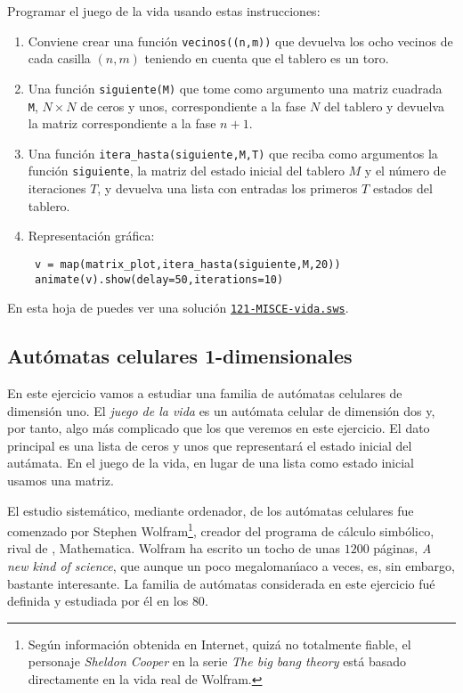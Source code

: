 \begin{ejer}
 
{\sc Programar} el juego de la vida usando estas instrucciones:

\begin{enumerate}
\item Conviene crear una funci\'on {\tt vecinos((n,m))} que devuelva los ocho
vecinos de cada casilla $(n,m)$ teniendo en cuenta que el tablero es un toro.
\item Una funci\'on {\tt siguiente(M)} que tome como argumento una matriz
cuadrada {\tt M}, $N\times N$ de ceros y unos,  correspondiente a la fase $N$
del tablero y devuelva la matriz correspondiente a la fase $n+1$. 
\item Una funci\'on {\tt itera\_hasta(siguiente,M,T)} que reciba como argumentos
la funci\'on {\tt siguiente},  la matriz del estado inicial del tablero $M$ y el
n\'umero de iteraciones $T$,  y devuelva una lista con entradas los primeros $T$
estados del tablero.
\item Representaci\'on gr\'afica:
\begin{verbatim}
 v = map(matrix_plot,itera_hasta(siguiente,M,20))
 animate(v).show(delay=50,iterations=10)
\end{verbatim}

\end{enumerate}

\end{ejer}

En esta hoja de {\sage} puedes ver una soluci\'on
\href{http://localhost:8080/home/admin/??}{\tt 121-MISCE-vida.sws}.

\subsection{Aut\'omatas celulares 1-dimensionales}

En este ejercicio vamos a estudiar una familia de aut\'omatas celulares de 
dimensi\'on uno. El {\itshape juego de la vida} es un aut\'omata celular de 
dimensi\'on dos y, por tanto, algo m\'as complicado que los que veremos en este 
ejercicio. El dato principal es una lista de ceros y unos que representar\'a el 
estado inicial del aut\'amata. En el juego de la vida, en lugar de una lista 
como estado inicial usamos una matriz.

El estudio sistem\'atico, mediante ordenador, de los aut\'omatas celulares fue 
comenzado por Stephen Wolfram\footnote{Seg\'un informaci\'on obtenida en Internet, quiz\'a no totalmente fiable, el personaje {\itshape Sheldon Cooper} en la serie {\itshape The big bang theory}  est\'a basado directamente en la vida real de Wolfram.}, creador del programa de c\'alculo simb\'olico, 
rival de {\sage}, Mathematica. Wolfram ha escrito un tocho de unas $1200$ 
p\'aginas, {\itshape A new kind of science}, que aunque un poco 
megaloman\'{\i}aco a veces, es,  sin embargo,  bastante interesante. La familia 
de aut\'omatas considerada en este ejercicio fu\'e definida y estudiada por 
\'el en los $80$. 

